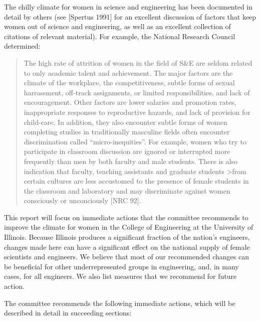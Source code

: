 The chilly climate for women in science and engineering has
been documented in detail by others (see [Spertus 1991] for
an excellent discussion of factors that keep women out of
science and engineering, as well as an excellent collection
of citations of relevant material).
For example, the National Research Council determined:
\begin{quote}
     The high rate of attrition of women in the field of S\&E are 
seldom related to only academic talent and achievement.  The major 
factors are the climate of the workplace, the competitiveness, subtle 
forms of sexual harrassment, off-track assignments, or limited 
responsibilities, and lack of encouragement.  Other factors are lower 
salaries and promotion rates, inappropriate responses to reproductive 
hazards, and lack of provision for child-care.  In addition, they also 
encounter subtle forms of women completing studies in traditionally 
masculine fields often encounter discrimination called 
``micro-inequities''.  For example, women who try to 
participate in classroom discussion are ignored or interrupted more 
frequently than men by both faculty and male students.  There is also 
indication that faculty, teaching assistants and graduate students 
>from certain cultures are less accustomed to the presence of female 
students in the classroom and laboratory and may discriminate against 
women consciously or unconciously [NRC 92].
\end{quote}
This report will focus on immediate actions that the
committee recommends to improve the climate for women
in the College of Engineering at the University of Illinois.
Because Illinois produces a significant fraction of the
nation's engineers,
 changes made here can have
a significant effect on the national supply of female scientists and
engineers.
We believe that most of our recommended changes can be beneficial
for other underrepresented groups in engineering,
and, in many cases, for all engineers.
We also list measures that we recommend for future action.

The committee recommends the following immediate actions,
which will be described in detail in succeeding sections:

